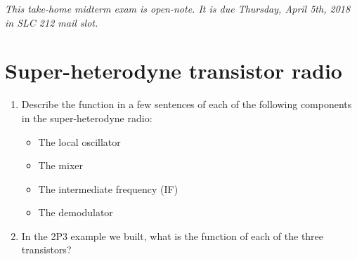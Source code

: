 \documentclass[10pt]{article}
\begin{document}
\maketitle

\textit{This take-home midterm exam is open-note.  It is due Thursday, April 5th, 2018 in SLC 212 mail slot.}

\section{Super-heterodyne transistor radio}
\begin{enumerate}
\item Describe the function in a few sentences of each of the following components in the super-heterodyne radio:
\begin{itemize}
\item The local oscillator \\ \vspace{0.33cm}
\item The mixer \\ \vspace{0.33cm}
\item The intermediate frequency (IF) \\ \vspace{0.33cm}
\item The demodulator \\ \vspace{0.33cm}
\end{itemize}
\item In the 2P3 example we built, what is the function of each of the three transistors? \\ \vspace{0.5cm}
\end{enumerate}
\end{document}
